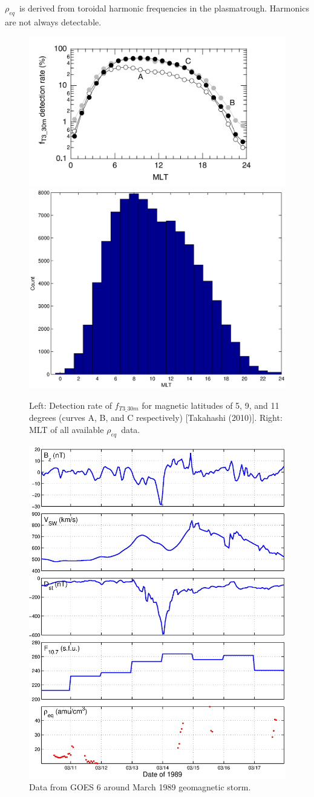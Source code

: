 \documentclass[xcolor={dvipsnames,table}]{beamer}
\newcommand{\req}{\ensuremath{\rho_{eq}}} %
\begin{document}
\begin{frame}
	\req\ is derived from toroidal harmonic frequencies in the plasmatrough. Harmonics are not always detectable.
	\begin{figure}[htp!]
		\centering
		\includegraphics[width=0.4\linewidth]{Figures/Takahashi2010Availability.png}
		\includegraphics[width=0.4\linewidth]{Figures/databyMLT}
		\caption{Left: Detection rate of $f_{T3\_30m}$ for magnetic latitudes of 5, 9, and 11 degrees (curves A, B, and C respectively) [Takahashi (2010)]. Right: MLT of all available \req\ data.}
		\label{fig:Takahashi2010Availability}
	\end{figure}
\end{frame}

\begin{frame}
\begin{figure}[htp!]
	\centering
	\includegraphics[width=0.5\linewidth]{Figures/alldata-GOES6-10Mar1989-17Mar1989.eps}%
	\caption{Data from GOES 6 around March 1989 geomagnetic storm.}
	\label{fig:alldata-GOES6-1989-1989}
\end{figure}
\end{frame}
\end{document}
